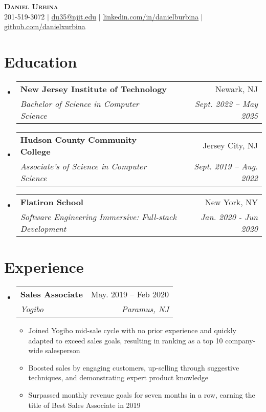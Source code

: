 \documentclass[letterpaper,11pt]{article}
\makeatletter
\newcommand{\resumeItem}[1]{
  \item\small{
    {#1 \vspace{-2pt}}
  }
}
\newcommand{\resumeSubheading}[4]{
  \vspace{-2pt}\item
    \begin{tabular*}{0.97\textwidth}[t]{l@{\extracolsep{\fill}}r}
      \textbf{#1} & #2 \\
      \textit{\small#3} & \textit{\small #4} \\
    \end{tabular*}\vspace{-7pt}
}
\newcommand{\resumeSubHeadingListStart}{\begin{itemize}[leftmargin=0.15in, label={}]}
\newcommand{\resumeSubHeadingListEnd}{\end{itemize}}
\newcommand{\resumeItemListStart}{\begin{itemize}}
\newcommand{\resumeItemListEnd}{\end{itemize}\vspace{-5pt}}
\makeatother
\begin{document}

\begin{center}
    \textbf{\Huge \scshape Daniel Urbina} \\ \vspace{1pt}
    \small 201-519-3072 $|$ \href{mailto:x@x.com}{\underline{du35@njit.edu}} $|$ 
    \href{https://linkedin.com/in/...}{\underline{linkedin.com/in/danielburbina}} $|$
    \href{https://github.com/...}{\underline{github.com/danielxurbina}}
\end{center}


\section{Education}
  \resumeSubHeadingListStart
    \resumeSubheading
      {New Jersey Institute of Technology}{Newark, NJ}
      {Bachelor of Science in Computer Science}{Sept. 2022 -- May 2025}
    \resumeSubheading
      {Hudson County Community College}{Jersey City, NJ}
      {Associate's of Science in Computer Science}{Sept. 2019 -- Aug. 2022}
    \resumeSubheading
        {Flatiron School}{New York, NY}
        {Software Engineering Immersive: Full-stack Development}{Jan. 2020 - Jun 2020}
  \resumeSubHeadingListEnd


\section{Experience}
  \resumeSubHeadingListStart
    \resumeSubheading
      {Sales Associate}{May. 2019 -- Feb 2020}
      {Yogibo}{Paramus, NJ}
      \resumeItemListStart
        \resumeItem{Joined Yogibo mid-sale cycle with no prior experience and quickly adapted to exceed sales goals, resulting in ranking as a top 10 company-wide salesperson}
        \resumeItem{Boosted sales by engaging customers, up-selling through suggestive techniques, and demonstrating expert product knowledge}
        \resumeItem{Surpassed monthly revenue goals for seven months in a row, earning the title of Best Sales Associate in 2019}
    \resumeItemListEnd
  \resumeSubHeadingListEnd
\end{document}
